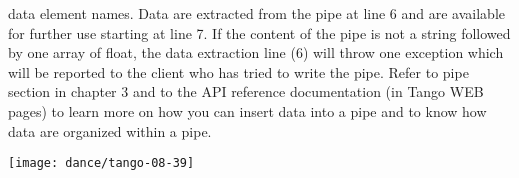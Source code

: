 data element names. Data are extracted from the pipe at line 6 and
are available for further use starting at line 7. If the content of
the pipe is not a string followed by one array of float, the data
extraction line (6) will throw one exception which will be reported
to the client who has tried to write the pipe. Refer to pipe section
in chapter 3 and to the API reference documentation (in Tango WEB
pages) to learn more on how you can insert data into a pipe and to
know how data are organized within a pipe.

\bigskip{}


\begin{center}

\label{BlackPicture}\texttt{[image: dance/tango-08-39]}

\end{center}

